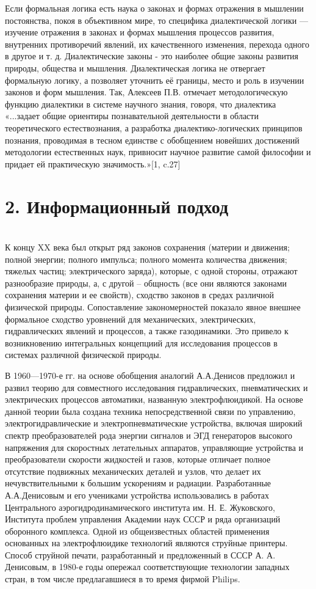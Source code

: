 \documentclass[a4paper,12pt]{report}
\begin{document}
	Если формальная логика есть наука о законах и формах отражения в мышлении постоянства, покоя в объективном мире, то специфика диалектической логики — изучение отражения в законах и формах мышления процессов развития, внутренних противоречий явлений, их качественного изменения, перехода одного в другое и т. д.  Диалектические законы - это наиболее общие законы развития природы, общества и мышления. Диалектическая логика не отвергает формальную логику, а позволяет уточнить её границы, место и роль в изучении законов и форм мышления. Так, Алексеев П.В. отмечает методологическую функцию диалектики в системе научного знания, говоря, что диалектика «...задает общие ориентиры познавательной деятельности в области теоретического естествознания, а разработка диалектико-логических принципов познания, проводимая в тесном единстве с обобщением новейших достижений методологии естественных наук, привносит научное развитие самой философии и придает ей практическую значимость.»[1, c.27] 


 \chapter*{2. Информационный подход }
  \\

К концу XX века был открыт ряд законов сохранения (материи и движения; полной энергии; полного импульса; полного момента количества движения; тяжелых частиц; электрического заряда), которые, с одной стороны, отражают разнообразие природы, а, с другой – общность (все они являются законами сохранения материи и ее свойств), сходство законов в средах различной физической природы. Сопоставление закономерностей показало явное внешнее формальное сходство уровнений для механических, электрических, гидравлических явлений и процессов, а также газодинамики.  Это привело к возникновению интегральных концепциий для исследования процессов в системах различной физической природы. 

	В 1960—1970-е гг. на основе обобщения аналогий А.А.Денисов предложил и развил теорию для совместного исследования гидравлических, пневматических и электрических процессов автоматики, названную электрофлюидикой. На основе данной теории была создана техника непосредственной связи по управлению, электрогидравлические и электропневматические устройства, включая широкий спектр преобразователей рода энергии сигналов и ЭГД генераторов высокого напряжения для скоростных летательных аппаратов, управляющие устройства и преобразователи скорости жидкостей и газов, которые отличает полное отсутствие подвижных механических деталей и узлов, что делает их нечувствительными к большим ускорениям и радиации.  Разработанные А.А.Денисовым и его учениками устройства использовались в работах Центрального аэрогидродинамического
института им. Н. Е. Жуковского, Института проблем управления Академии наук СССР и ряда организаций оборонного комплекса. Одной из общеизвестных областей применения основанных на электрофлюидике технологий являются струйные принтеры. Способ струйной печати, разработанный и предложенный в СССР А. А. Денисовым, в 1980-е годы опережал соответствующие технологии западных стран, в том числе предлагавшиеся в то время фирмой Philips.
\end{document}
